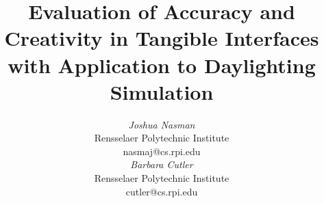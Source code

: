\documentclass{article}
\begin{document}

 \toappear{}

%
%



\title{
Evaluation of Accuracy and Creativity in Tangible Interfaces 
  with Application to Daylighting Simulation}





\author{
\parbox[t]{9cm}{\centering
	     {\em Joshua Nasman}\\
	     Rensselaer Polytechnic Institute\\
	     nasmaj@cs.rpi.edu}
\parbox[t]{9cm}{\centering
	     {\em Barbara Cutler}\\
	     Rensselaer Polytechnic Institute\\
	     cutler@cs.rpi.edu}
}


\maketitle
\end{document}
